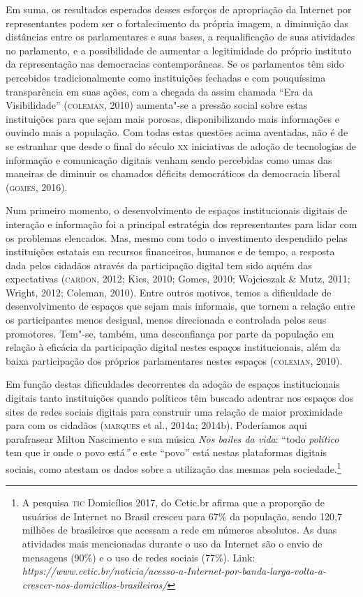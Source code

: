 Em suma, os resultados esperados desses esforços de apropriação da
Internet por representantes podem ser o fortalecimento da própria
imagem, a diminuição das distâncias entre os parlamentares e suas bases,
a requalificação de suas atividades no parlamento, e a possibilidade de
aumentar a legitimidade do próprio instituto da representação nas
democracias contemporâneas. Se os parlamentos têm sido percebidos
tradicionalmente como instituições fechadas e com pouquíssima
transparência em suas ações, com a chegada da assim chamada ``Era da
Visibilidade'' (\textsc{coleman}, 2010) aumenta"-se a pressão social sobre estas
instituições para que sejam mais porosas, disponibilizando mais
informações e ouvindo mais a população. Com todas estas questões acima
aventadas, não é de se estranhar que desde o final do século \textsc{xx}
iniciativas de adoção de tecnologias de informação e comunicação
digitais venham sendo percebidas como umas das maneiras de diminuir os
chamados déficits democráticos da democracia liberal (\textsc{gomes}, 2016).

Num primeiro momento, o desenvolvimento de espaços institucionais
digitais de interação e informação foi a principal estratégia dos
representantes para lidar com os problemas elencados. Mas, mesmo com
todo o investimento despendido pelas instituições estatais em recursos
financeiros, humanos e de tempo, a resposta dada pelos cidadãos através
da participação digital tem sido aquém das expectativas (\textsc{cardon}, 2012;
Kies, 2010; Gomes, 2010; Wojcieszak \& Mutz, 2011; Wright, 2012;
Coleman, 2010). Entre outros motivos, temos a dificuldade de
desenvolvimento de espaços que sejam mais informais, que tornem a
relação entre os participantes menos desigual, menos direcionada e
controlada pelos seus promotores. Tem"-se, também, uma desconfiança por
parte da população em relação à eficácia da participação digital nestes
espaços institucionais, além da baixa participação dos próprios
parlamentares nestes espaços (\textsc{coleman}, 2010).

Em função destas dificuldades decorrentes da adoção de espaços
institucionais digitais tanto instituições quando políticos têm buscado
adentrar nos espaços dos sites de redes sociais digitais para construir
uma relação de maior proximidade para com os cidadãos (\textsc{marques} et al.,
2014a; 2014b). Poderíamos aqui parafrasear Milton
Nascimento e sua música \emph{Nos bailes da vida}: ``todo
\emph{político} tem que ir onde o povo está\emph{''} e este ``povo''
está nestas plataformas digitais sociais, como atestam os dados sobre a
utilização das mesmas pela sociedade.\footnote{A pesquisa \textsc{tic} Domicílios
  2017, do Cetic.br afirma que a proporção de usuários de Internet no
  Brasil cresceu para 67\% da população, sendo 120,7 milhões de
  brasileiros que acessam a rede em números absolutos. As duas
  atividades mais mencionadas durante o uso da Internet são o envio de
  mensagens (90\%) e o uso de redes sociais (77\%). Link:
  \emph{https://www.cetic.br/noticia/acesso-a-Internet-por-banda-larga-volta-a-crescer-nos-domicilios-brasileiros/}}

